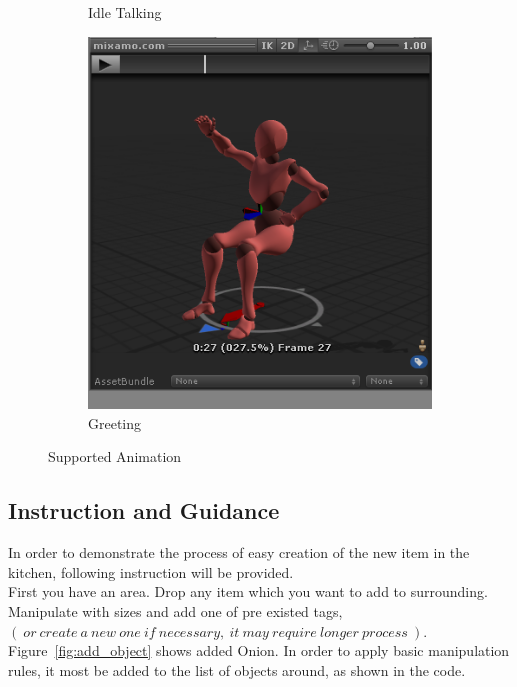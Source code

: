 \documentclass[18pt]{article}
\numberwithin{equation}{section} %
\numberwithin{figure}{section} %
\numberwithin{table}{section} %
\begin{document}
\begin{figure}[H]
\begin{subfigure}{0.2\textwidth}
				\caption{Idle Talking}
			\end{subfigure}
			\begin{subfigure}{0.2\textwidth}
				\centering
				\includegraphics[width=0.96\linewidth]{images/sit_wave}
				\caption{Greeting}
			\end{subfigure}				
			\caption{Supported Animation}
			\label{fig:animat}
		\end{figure}
	
	\subsection{Instruction and Guidance}
	
		In order to demonstrate the process of easy creation of the new item in the kitchen, following instruction will be provided.\\
		
		First you have an area. Drop any item which you want to add to surrounding. Manipulate with sizes and add one of pre existed tags, $\left(\ or\ create\ a\ new\ one\ if\ necessary,\ it\ may\ require\ longer\ process\  \right) . $ Figure~\ref{fig:add_object} shows added Onion. In order to apply basic manipulation rules, it most be added to the list of objects around, as shown in the code. \\
		
\end{document}
